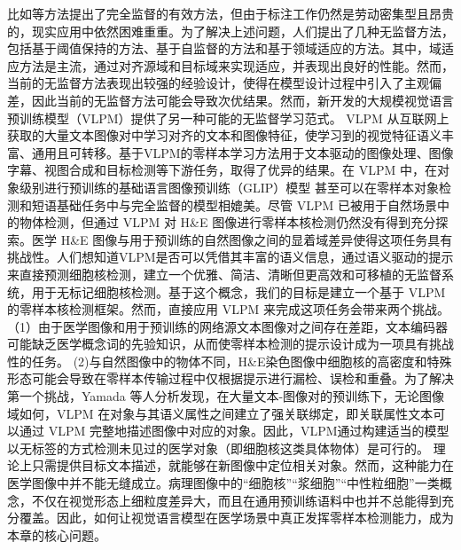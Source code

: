 比如\cite{mahanta2021ihc,graham2019hover,yi2019multi}等方法提出了完全监督的有效方法，但由于标注工作仍然是劳动密集型且昂贵的，现实应用中依然困难重重。为了解决上述问题，人们提出了几种无监督方法，包括基于阈值保持的方法\cite{jiao2006improved,mouelhi2018fast}、基于自监督的方法\cite{sahasrabudhe2020self}和基于领域适应的方法\cite{le2022unsupervised}。其中，域适应方法是主流，通过对齐源域和目标域来实现适应，并表现出良好的性能\cite{le2022unsupervised}。然而，当前的无监督方法表现出较强的经验设计，使得在模型设计过程中引入了主观偏差，因此当前的无监督方法可能会导致次优结果。然而，新开发的大规模视觉语言预训练模型（VLPM）提供了另一种可能的无监督学习范式\cite{radford2021learning,jia2021scaling}。 VLPM 从互联网上获取的大量文本图像对中学习对齐的文本和图像特征，使学习到的视觉特征语义丰富、通用且可转移。基于VLPM的零样本学习方法用于文本驱动的图像处理\cite{patashnik2021styleclip}、图像字幕\cite{li2022blip}、视图合成\cite{jain2021putting}和目标检测\cite{li2022grounded}等下游任务，取得了优异的结果。在 VLPM 中，在对象级别进行预训练的基础语言图像预训练（GLIP）模型 \cite{li2022grounded} 甚至可以在零样本对象检测和短语基础任务中与完全监督的模型相媲美。尽管 VLPM 已被用于自然场景中的物体检测，但通过 VLPM 对 H\&E 图像进行零样本核检测仍然没有得到充分探索。医学 H\&E 图像与用于预训练的自然图像之间的显着域差异使得这项任务具有挑战性。人们想知道VLPM是否可以凭借其丰富的语义信息，通过语义驱动的提示来直接预测细胞核检测，建立一个优雅、简洁、清晰但更高效和可移植的无监督系统，用于无标记细胞核检测。基于这个概念，我们的目标是建立一个基于 VLPM 的零样本核检测框架。然而，直接应用 VLPM 来完成这项任务会带来两个挑战。 （1）由于医学图像和用于预训练的网络源文本图像对之间存在差距，文本编码器可能缺乏医学概念词的先验知识，从而使零样本检测的提示设计成为一项具有挑战性的任务。 (2)与自然图像中的物体不同，H\&E染色图像中细胞核的高密度和特殊形态可能会导致在零样本传输过程中仅根据提示进行漏检、误检和重叠。为了解决第一个挑战，Yamada 等人分析发现，在大量文本-图像对的预训练下，无论图像域如何，VLPM 在对象与其语义属性之间建立了强关联绑定，即关联属性文本可以通过 VLPM 完整地描述图像中对应的对象\cite{yamada2022lemons}。因此，VLPM通过构建适当的模型以无标签的方式检测未见过的医学对象（即细胞核这类具体物体）是可行的。
理论上只需提供目标文本描述，就能够在新图像中定位相关对象。然而，这种能力在医学图像中并不能无缝成立。病理图像中的“细胞核”“浆细胞”“中性粒细胞”一类概念，不仅在视觉形态上细粒度差异大，而且在通用预训练语料中也并不总能得到充分覆盖。因此，如何让视觉语言模型在医学场景中真正发挥零样本检测能力，成为本章的核心问题。
